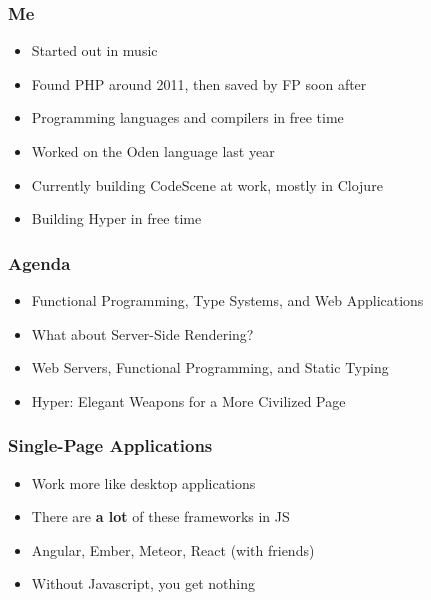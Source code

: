 \begin{frame}
  \titlepage
\end{frame}

\begin{frame}
  \frametitle{Me}
  \begin{itemize}
    \pause
    \item<+-> Started out in music
    \item<+-> Found PHP around 2011, then saved by FP soon after
    \item<+-> Programming languages and compilers in free time
    \item<+-> Worked on the Oden language last year
    \item<+-> Currently building CodeScene at work, mostly in Clojure
    \item<+-> Building Hyper in free time
  \end{itemize}
\end{frame}

\begin{frame}
  \frametitle{Agenda}
  \begin{itemize}
    \pause
    \item<+-> Functional Programming, Type Systems, and Web Applications
    \item<+-> What about Server-Side Rendering?
    \item<+-> Web Servers, Functional Programming, and Static Typing
    \item<+-> Hyper: Elegant Weapons for a More Civilized Page
  \end{itemize}
\end{frame}

\begin{frame}
\end{frame}

\begin{frame}
  \frametitle{Single-Page Applications}
  \begin{itemize}
    \pause
    \item<+-> Work more like desktop applications
    \item<+-> There are \textbf{a lot} of these frameworks in JS
    \item<+-> Angular, Ember, Meteor, React (with friends)
    \item<+-> Without Javascript, you get nothing
  \end{itemize}
\end{frame}

